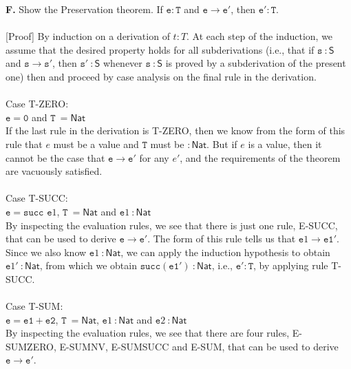 \documentclass[a4paper]{article}
\begin{document}
\textbf{F.} Show the Preservation theorem. If $\mathtt e : \mathtt T$ and
$\mathtt e \rightarrow \mathtt{e'}$, then $\mathtt{e'} : \mathtt T$.\\\\
{[Proof]} By induction on a derivation of $t:T$. At each step of the induction, we assume that the desired property holds for all subderivations (i.e., that if $\mathtt s ~\mathsf {: S}$ and $\mathtt s \rightarrow \mathtt s'$, then $\mathtt s' ~\mathsf {: S}$ whenever $\mathtt s ~\mathsf {: S}$ is proved by a subderivation of the present one) then  and proceed by case analysis on the final rule in the derivation.\\\\
Case T-ZERO:\\
$\mathtt {e = 0}$ and $\mathtt T~\mathsf {= Nat}$\\
If the last rule in the derivation is T-ZERO, then we know from the form of this rule that $e$ must be a value and $\mathtt T$ must be $\mathsf { : Nat}$. But if $e$ is a value, then it cannot be the case that $\mathtt e \rightarrow \mathtt{e'}$ for any $e'$, and the requirements of the theorem are vacuously satisfied.
\\\\
Case T-SUCC:\\
$\mathtt {e = succ}$ $\mathtt e1$, $\mathtt T~\mathsf {= Nat}$ and $\mathtt e1 ~\mathsf {: Nat}$\\
By inspecting the evaluation rules, we see that there is just one rule, E-SUCC, that can be used to derive $\mathtt e \rightarrow \mathtt{e'}$. The form of this rule tells us that $\mathtt e1 \rightarrow \mathtt{e1'}$. Since we also know $\mathtt e1 ~\mathsf {: Nat}$, we can apply the induction hypothesis to obtain $\mathtt e1' ~\mathsf {: Nat}$, from which we obtain $\mathtt {succ(e1')} ~\mathsf {: Nat}$, i.e., $\mathtt{e'} : \mathtt T$, by applying rule T-SUCC.\\\\
Case T-SUM:\\
$\mathtt {e = e1 + e2}$, $\mathtt T~\mathsf {= Nat}$, $\mathtt e1 ~\mathsf {: Nat}$ and $\mathtt e2 ~\mathsf {: Nat}$\\
By inspecting the evaluation rules, we see that there are four rules, E-SUMZERO, E-SUMNV, E-SUMSUCC and E-SUM, that can be used to derive $\mathtt e \rightarrow \mathtt{e'}$.
\end{document}
